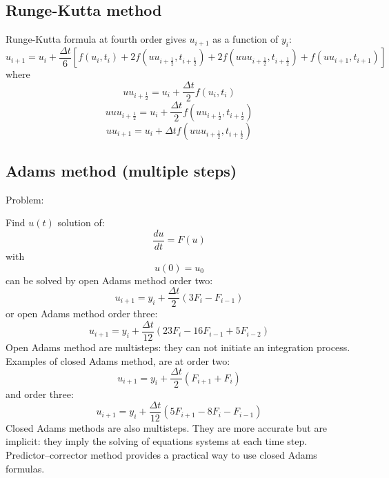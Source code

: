 \documentclass[12pt]{book}
\begin{document}
\subsection{Runge-Kutta method}
Runge-Kutta formula  at fourth order gives $u_{i+1}$ as a
function of $y_i$: 
\begin{equation}
u_{i+1}=u_i+\frac{\Delta
t}{6}[f(u_i,t_i)+2f(uu_{i+\frac{1}{2}},t_{i+\frac{1}{2}})+
2f(uuu_{i+\frac{1}{2}},t_{i+\frac{1}{2}})+ f(uu_{i+1},t_{i+1})]
\end{equation}
where
\begin{equation}
uu_{i+\frac{1}{2}}=u_i+\frac{\Delta t}{2}f(u_i,t_i)
\end{equation}
\begin{equation}
uuu_{i+\frac{1}{2}}=u_i+\frac{\Delta t}{2}f(uu_{i+\frac{1}{2}},t_{i+\frac{1}{2}})
\end{equation}
\begin{equation}
uu_{i+1}=u_i+{\Delta t}f(uuu_{i+\frac{1}{2}},t_{i+\frac{1}{2}})
\end{equation}

\subsection{Adams method (multiple steps)}
Problem:

Find $u(t)$ solution of:
\begin{equation}
\frac{d u}{dt}=F(u)
\end{equation}
with
\begin{equation}
u(0)=u_0
\end{equation}
can be solved by 
open Adams method order two:
\begin{equation}
u_{i+1}=y_i+\frac{\Delta t}{2}(3F_i-F_{i-1})
\end{equation}
or open Adams method order three:
\begin{equation}
u_{i+1}=y_i+\frac{\Delta t}{12}(23F_i-16F_{i-1}+5F_{i-2})
\end{equation}
Open Adams method are multisteps: they can not initiate an integration
process. Examples of closed Adams method, are at order two:
\begin{equation}
u_{i+1}=y_i+\frac{\Delta t}{2}(F_{i+1}+F_{i})
\end{equation}
and order three:
\begin{equation}
u_{i+1}=y_i+\frac{\Delta t}{12}(5F_{i+1}-8F_{i}-F_{i-1})
\end{equation}
Closed Adams methods are also multisteps. They are more accurate but are
implicit: they imply the solving of equations systems at each time
step. Predictor--corrector method provides a practical way to use closed Adams
formulas. 
\end{document}
